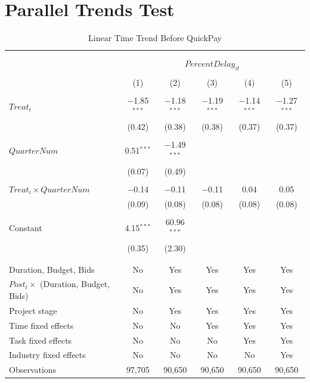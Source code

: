 \documentclass[
]{article}
\begin{document}
\hypertarget{parallel-trends-test}{%
\section{Parallel Trends Test}\label{parallel-trends-test}}

\begin{table}[H] \centering 
  \caption{Linear Time Trend Before QuickPay} 
  \label{} 
\small 
\begin{tabular}{@{\extracolsep{-2pt}}lccccc} 
\\[-1.8ex]\hline 
\hline \\[-1.8ex] 
\\[-1.8ex] & \multicolumn{5}{c}{$PercentDelay_{it}$} \\ 
\\[-1.8ex] & (1) & (2) & (3) & (4) & (5)\\ 
\hline \\[-1.8ex] 
 $Treat_i$ & $-$1.85$^{***}$ & $-$1.18$^{***}$ & $-$1.19$^{***}$ & $-$1.14$^{***}$ & $-$1.27$^{***}$ \\ 
  & (0.42) & (0.38) & (0.38) & (0.37) & (0.37) \\ 
  & & & & & \\ 
 $QuarterNum$ & 0.51$^{***}$ & $-$1.49$^{***}$ &  &  &  \\ 
  & (0.07) & (0.49) &  &  &  \\ 
  & & & & & \\ 
 $Treat_i \times QuarterNum$ & $-$0.14 & $-$0.11 & $-$0.11 & 0.04 & 0.05 \\ 
  & (0.09) & (0.08) & (0.08) & (0.08) & (0.08) \\ 
  & & & & & \\ 
 Constant & 4.15$^{***}$ & 60.96$^{***}$ &  &  &  \\ 
  & (0.35) & (2.30) &  &  &  \\ 
  & & & & & \\ 
\hline \\[-1.8ex] 
Duration, Budget, Bids & No & Yes & Yes & Yes & Yes \\ 
$Post_t \times$  (Duration, Budget, Bids) & No & Yes & Yes & Yes & Yes \\ 
Project stage & No & Yes & Yes & Yes & Yes \\ 
Time fixed effects & No & No & Yes & Yes & Yes \\ 
Task fixed effects & No & No & No & Yes & Yes \\ 
Industry fixed effects & No & No & No & No & Yes \\ 
Observations & 97,705 & 90,650 & 90,650 & 90,650 & 90,650 \\ 

\end{tabular}
\end{table}
\end{document}
